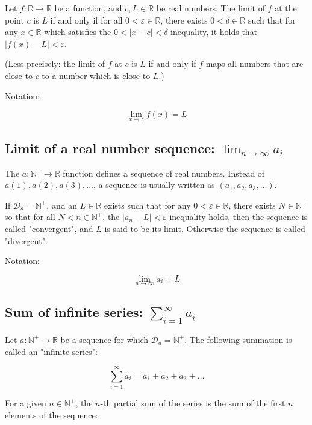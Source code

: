 \documentclass[titlepage]{article}
\begin{document}
        Let $f : \mathbb{R} \rightarrow \mathbb{R}$ be a function, and
        $c, L \in \mathbb{R}$ be real numbers. The limit of $f$ at the point
        $c$ is $L$ if and only if for all $0 < \varepsilon \in \mathbb{R}$,
        there exists $0 < \delta \in \mathbb{R}$ such that for any
        $x \in \mathbb{R}$ which satisfies the $0 < | x-c | < \delta$
        inequality, it holds that $| f(x) - L | < \varepsilon$.

        (Less precisely: the limit of $f$ at $c$ is $L$ if and only if $f$ maps
        all numbers that are close to $c$ to a number which is close to $L$.)

        Notation:

        $$\lim_{x \to c} f(x) = L$$

      \subsection{Limit of a real number sequence: $\lim_{n \to \infty} a_i$}

        The $a : \mathbb{N}^+ \rightarrow \mathbb{R}$ function defines a
        sequence of real numbers. Instead of $a(1), a(2), a(3), \ldots$, a
        sequence is usually written as $(a_1, a_2, a_3, \ldots)$.

        If $\mathcal{D}_a = \mathbb{N}^+$, and an $L \in \mathbb{R}$ exists
        such that for any $0 < \varepsilon \in \mathbb{R}$, there exists
        $N \in \mathbb{N}^+$ so that for all $N < n \in \mathbb{N}^+$, the
        $|a_n - L| < \varepsilon$ inequality holds, then the sequence is called
        "convergent", and $L$ is said to be its limit. Otherwise the sequence is
        called "divergent".

        Notation:

        $$\lim_{n \to \infty} a_i = L$$

      \subsection{Sum of infinite series: $\sum_{i=1}^\infty a_i$}

        Let $a : \mathbb{N}^+ \rightarrow \mathbb{R}$ be a sequence for which
        $\mathcal{D}_a = \mathbb{N}^+$. The following summation is called an
        "infinite series":

        $$\sum_{i=1}^\infty a_i = a_1 + a_2 + a_3 + \ldots$$

        For a given $n \in \mathbb{N}^+$, the $n$-th partial sum of the series
        is the sum of the first $n$ elements of the sequence:
\end{document}
